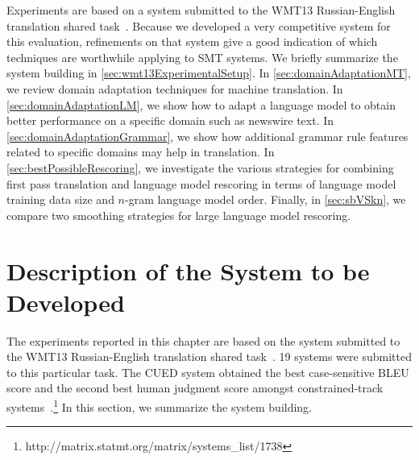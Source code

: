 Experiments are based on a system submitted to the WMT13
Russian-English translation shared
task~\citep{pino-waite-xiao-degispert-flego-byrne:2013:WMT}.
Because we developed a very competitive system for this evaluation,
refinements on that system give a good indication of which techniques
are worthwhile applying to SMT systems.
We briefly summarize the system building in
\autoref{sec:wmt13ExperimentalSetup}.
In \autoref{sec:domainAdaptationMT}, we review domain adaptation
techniques for machine translation. In \autoref{sec:domainAdaptationLM},
we show how to adapt a language model to obtain better performance
on a specific domain such as newswire text.
In \autoref{sec:domainAdaptationGrammar}, we show how additional
grammar rule features related to specific domains may help in translation.
In \autoref{sec:bestPossibleRescoring}, we investigate
the various strategies for combining first pass translation
and language model rescoring in terms of language model
training data size and $n$-gram language model order.
Finally, in \autoref{sec:sbVSkn}, we compare two smoothing
strategies for large language model rescoring.

\section{Description of the System to be Developed}
\label{sec:wmt13ExperimentalSetup}

The experiments reported in this chapter are based
on the system submitted to the WMT13 Russian-English translation shared
task~\citep{pino-waite-xiao-degispert-flego-byrne:2013:WMT}.
19 systems were submitted to this particular task. The
CUED system obtained the best case-sensitive BLEU
score and the second best human judgment score
amongst constrained-track
systems~\citep{bojar-buck-callisonburch-federmann-haddow-koehn-monz-post-soricut-specia:2013:WMT}.\footnote{http://matrix.statmt.org/matrix/systems\_list/1738}
In this section, we summarize the system building.

